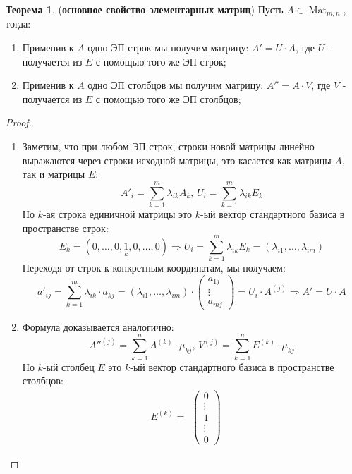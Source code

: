 \documentclass[12pt]{article}
\theoremstyle{definition}
\newtheorem{theorem}{Теорема}
\newcommand{\ddsum}[2]{\displaystyle\sum\limits_{#1}^{#2}}
\newcommand{\mat}[2]{\operatorname{Mat}_{#1, #2}}
\begin{document}
\begin{theorem}(\textbf{основное свойство элементарных матриц}) Пусть $A \in \mat{m}{n}$, тогда:
	\begin{enumerate}[label = \arabic*)]
		\item Применив к $A$ одно ЭП строк мы получим матрицу: $A' = U{\cdot}A$, где $U$ - получается из $E$ с помощью того же ЭП строк;
		\item Применив к $A$ одно ЭП столбцов мы получим матрицу: $A'' = A{\cdot}V$, где $V$ - получается из $E$ с помощью того же ЭП столбцов;
	\end{enumerate}
\end{theorem}
\begin{proof}\hfill
	\begin{enumerate}[label = \arabic*)]
		\item Заметим, что при любом ЭП строк, строки новой матрицы линейно выражаются через строки исходной матрицы, это касается как матрицы $A$, так и матрицы $E$:
		$$
			A'_i = \ddsum{k = 1}{m}\lambda_{ik}A_k, \, U_i = \ddsum{k = 1}{m}\lambda_{ik}E_k
		$$
		Но $k$-ая строка единичной матрицы это $k$-ый вектор стандартного базиса в пространстве строк: 
		$$
			E_k = (0, \dotsc,0,\underset{k}{1},0,\dotsc,0) \Rightarrow U_i = \ddsum{k = 1}{m}\lambda_{ik}E_k = (\lambda_{i1}, \dotsc, \lambda_{im})
		$$
		Переходя от строк к конкретным координатам, мы получаем:
		$$
			a'_{ij} = \ddsum{k = 1}{m}\lambda_{ik}{\cdot}a_{kj} = (\lambda_{i1}, \dotsc, \lambda_{im}){\cdot}
			\begin{pmatrix}
				a_{1j}\\
				\vdots\\
				a_{mj}
			\end{pmatrix} = U_i{\cdot}A^{(j)} \Rightarrow A' = U{\cdot}A
		$$	
		\item Формула доказывается аналогично: 
		$$
			A''^{(j)} =\ddsum{k = 1}{n}A^{(k)}{\cdot}\mu_{kj}, \, V^{(j)} = \ddsum{k = 1}{n}E^{(k)}{\cdot}\mu_{kj}
		$$
		Но $k$-ый столбец $E$ это $k$-ый вектор стандартного базиса в пространстве столбцов: 
		$$
			E^{(k)} =  
			\begin{matrix}
				\begin{pmatrix}
					0 \\
					\vdots\\
					1\\
					\vdots\\
					0
				\end{pmatrix}
				\begin{matrix}
					\\

\end{matrix}
\end{matrix}$$
\end{enumerate}
\end{proof}
\end{document}
